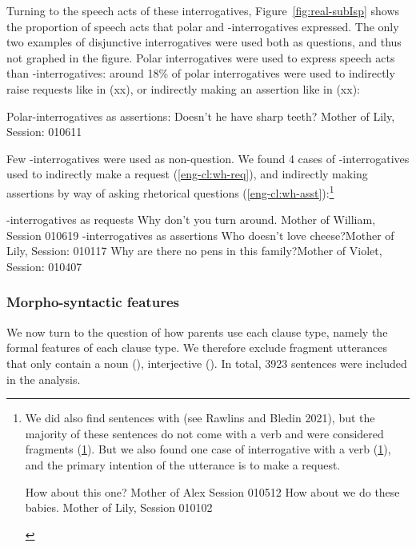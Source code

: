 Turning to the speech acts of these interrogatives, Figure~\ref{fig:real-subIsp} shows the proportion of speech acts that polar and \twh-interrogatives expressed. The only two examples of disjunctive interrogatives were used both as questions, and thus not graphed in the figure. Polar interrogatives were used to express speech acts than \twh-interrogatives: around 18\% of polar interrogatives were used to indirectly raise requests like in (xx), or indirectly making an assertion like in (xx):

Polar-interrogatives as assertions:
\bxl{}
Doesn’t he have sharp teeth?	\hfill	Mother of Lily, Session: 010611
\exl
\eex

Few \twh-interrogatives were used as non-question. We found 4 cases of \twh-interrogatives used to indirectly make a request (\ref{eng-cl:wh-req}), and indirectly making assertions by way of asking rhetorical questions (\ref{eng-cl:wh-asst}):\footnote{We did also find sentences with  (see Rawlins and Bledin 2021), but the majority of these sentences do not come with a verb and were considered fragments (\ref{eng-cl:howabout-frag}). But we also found one case of  interrogative with a verb (\ref{eng-cl:howabout-int}), and the primary intention of the utterance is to make a request. 

\begin{xlisti}
\ex \label{eng-cl:howabout-frag} How about this one?	\hfill	Mother of Alex Session 010512
\ex \label{eng-cl:howabout-int} How about we do these babies. \hfill	Mother of Lily, Session 010102
\end{xlisti}
}


\twh-interrogatives as requests
\bxl{}
Why don’t you turn around.	\hfill Mother of William, Session 010619
\exl
\eex
{}
\twh-interrogatives as assertions
\bxl{}
Who doesn’t love cheese?\hfill	Mother of Lily, Session: 010117
\ex Why are there no pens in this family?\hfill	Mother of Violet, Session: 010407
\exl
\eex




\subsubsection{Morpho-syntactic features}
\label{sec:eng-cl:corpus:formal}
We now turn to the question of how parents use each clause type, namely the formal features of each clause type. We therefore exclude fragment utterances that only contain a noun (), interjective (). In total, 3923 sentences were included in the analysis.

